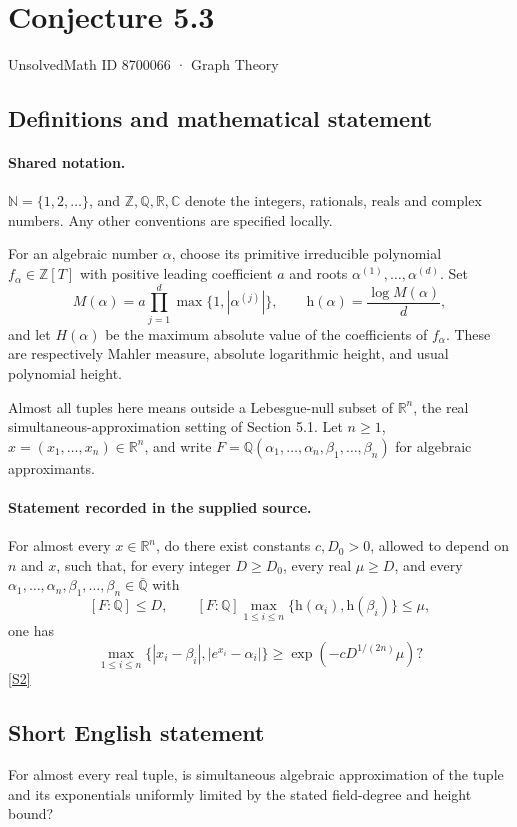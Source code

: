 \documentclass[11pt]{article}
\newcommand{\sref}[2]{\hyperlink{source:#1:#2}{[S#2]}}
\begin{document}
\setcounter{section}{8700065}
\section{Conjecture 5.3}\label{8700066}
{\small\sffamily UnsolvedMath ID 8700066 · Graph Theory}
\subsection{Definitions and mathematical statement}

\paragraph{Shared notation.}$\mathbb N=\{1,2,\ldots\}$, and $\mathbb Z,\mathbb Q,\mathbb R,\mathbb C$ denote the integers, rationals, reals and complex numbers. Any other conventions are specified locally.


For an algebraic number $\alpha$, choose its primitive irreducible polynomial $f_\alpha\in\mathbb Z[T]$ with positive leading coefficient $a$ and roots $\alpha^{(1)},\ldots,\alpha^{(d)}$. Set
\[
 M(\alpha)=a\prod_{j=1}^d\max\{1,|\alpha^{(j)}|\},\qquad
 \mathrm h(\alpha)=\frac{\log M(\alpha)}d,
\]
and let $H(\alpha)$ be the maximum absolute value of the coefficients of $f_\alpha$. These are respectively Mahler measure, absolute logarithmic height, and usual polynomial height.

Almost all tuples here means outside a Lebesgue-null subset of $\mathbb R^n$, the real simultaneous-approximation setting of Section 5.1. Let $n\ge1$, $x=(x_1,\ldots,x_n)\in\mathbb R^n$, and write $F=\mathbb Q(\alpha_1,\ldots,\alpha_n,\beta_1,\ldots,\beta_n)$ for algebraic approximants.
\paragraph{Statement recorded in the supplied source.}
For almost every $x\in\mathbb R^n$, do there exist constants $c,D_0>0$, allowed to depend on $n$ and $x$, such that, for every integer $D\ge D_0$, every real $\mu\ge D$, and every $\alpha_1,\ldots,\alpha_n,\beta_1,\ldots,\beta_n\in\overline{\mathbb Q}$ with
\[
[F:\mathbb Q]\le D,\qquad [F:\mathbb Q]\max_{1\le i\le n}\{\mathrm h(\alpha_i),\mathrm h(\beta_i)\}\le\mu,
\]
one has
\[
\max_{1\le i\le n}\{|x_i-\beta_i|,|e^{x_i}-\alpha_i|\}\ge\exp(-cD^{1/(2n)}\mu)?
\] \sref{8700066}{2}

\subsection{Short English statement}
For almost every real tuple, is simultaneous algebraic approximation of the tuple and its exponentials uniformly limited by the stated field-degree and height bound?
\end{document}
